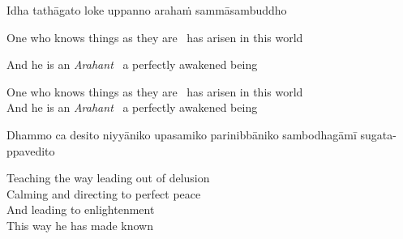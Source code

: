 \begin{pali-hang}
Idha tathāgato loke uppanno arahaṁ sammāsambuddho
\end{pali-hang}


\ifninebythirteen

\begin{english-hang}
  One who knows things as they are \breathmark\ has arisen in this world\makeatletter\hyperlink{endnote12-appendix}\makeatother
\end{english-hang}
\begin{english-hang}
  And he is an \textit{Arahant} \breathmark\ a perfectly awakened being
\end{english-hang}

\else

\begin{english}
  One who knows things as they are \breathmark\ has arisen in this world\makeatletter\hyperlink{endnote12-appendix}\makeatother\\
  And he is an \textit{Arahant} \breathmark\ a perfectly awakened being
\end{english}

\fi

\begin{pali-hang}
  Dhammo ca desito niyyāniko upasamiko parinibbāniko sambodhagāmī sugata-ppavedito
\end{pali-hang}

\begin{english-verses}
  Teaching the way leading out of delusion\makeatletter\hyperlink{endnote13-appendix}\makeatother\\
  Calming and directing to perfect peace\\
  And leading to enlightenment\\
  This way he has made known\\
\end{english-verses}

